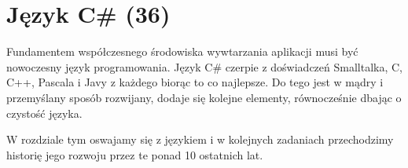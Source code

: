 ﻿\chapter{Język C\# (36)}

Fundamentem współczesnego środowiska wywtarzania aplikacji musi być nowoczesny język programowania. Język C\# czerpie z doświadczeń Smalltalka, C, C++, Pascala i Javy
z każdego biorąc to co najlepsze. Do tego jest w mądry i przemyślany sposób rozwijany, dodaje się kolejne elementy, równocześnie dbając o czystość języka.

W rozdziale tym oswajamy się z językiem i w kolejnych zadaniach przechodzimy historię jego rozwoju przez te ponad 10 ostatnich lat.

 
 



